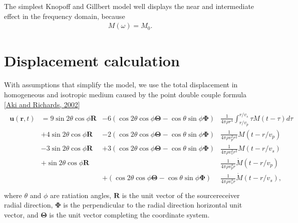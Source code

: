 \documentclass[letterpaper,10pt,english]{sphinxmanual}
\begin{document}
\sphinxAtStartPar
The simplest Knopoff and Gillbert model well displays the near and intermediate effect
in the frequency domain, because
\begin{equation}\label{equation:description:eq_b5}
\begin{split}M\left( \omega \right) = M_0.\end{split}
\end{equation}

\section{Displacement calculation}
\label{\detokenize{description:displacement-calculation}}
\sphinxAtStartPar
With assumptions that simplify the model, we use the total displacement in homogeneous and isotropic medium
caused by the point double couple formula {[}\hyperlink{cite.bibliography:id11}{Aki and Richards, 2002}{]}
\begin{equation}\label{equation:description:eq_a0}
\begin{split}\begin{matrix}
\mathbf{u}\left ( \mathbf{r},t \right ) &
=9\sin2\theta\cos\phi\mathbf{R} &
-6\left(\cos2\theta\cos\phi\mathbf{\Theta} - \cos\theta\sin\phi\mathbf{\Phi}  \right)  &
\frac{1}{4\pi\rho r^4}\int_{r/v_p}^{r/v_s}\tau M\left( t-\tau \right)d\tau  \\ &
+4 \sin2\theta\cos\phi\mathbf{R} &
-2 \left(\cos2\theta\cos\phi\mathbf{\Theta} - \cos\theta\sin\phi\mathbf{\Phi}  \right)  &
\frac{1}{4\pi\rho v_p^2 r^2}M\left( t-r/v_p \right)  \\ &
-3 \sin2\theta\cos\phi\mathbf{R} &
+3 \left(\cos2\theta\cos\phi\mathbf{\Theta} - \cos\theta\sin\phi\mathbf{\Phi}  \right)  &
\frac{1}{4\pi\rho v_s^2 r^2}M\left( t-r/v_s \right)  \\ &
+ \sin2\theta\cos\phi\mathbf{R} & &
\frac{1}{4\pi\rho v_p^3 r}\dot{M}\left( t-r/v_p \right)  \\ & &
+ \left(\cos2\theta\cos\phi\mathbf{\Theta} - \cos\theta\sin\phi\mathbf{\Phi}  \right)  &
\frac{1}{4\pi\rho v_s^3 r}\dot{M}\left( t-r/v_s \right),  \\
\end{matrix}\end{split}
\end{equation}
\sphinxAtStartPar
where \(\theta\) and \(\phi\) are ratiation angles,
\(\mathbf{R}\) is the unit vector of the source\sphinxhyphen{}receiver radial direction,
\(\mathbf{\Phi}\) is the perpendicular to the radial direction horizontal unit vector,
and \(\mathbf{\Theta}\) is the unit vector completing the coordinate system.
\end{document}
